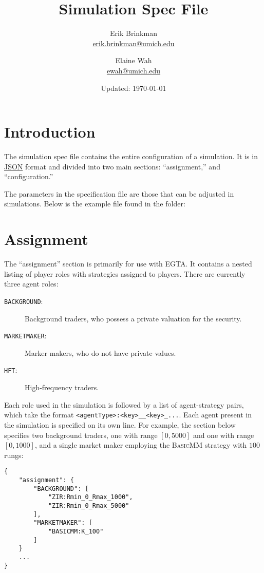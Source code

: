 \documentclass[11pt]{article}
\begin{document}
	
\title{Simulation Spec File}
\author{
  Erik Brinkman \\
  \href{mailto:erik.brinkman@umich.edu}{erik.brinkman@umich.edu}
  \and
  Elaine Wah \\
  \href{mailto:ewah@umich.edu}{ewah@umich.edu}
}
\date{Updated: \today}
\maketitle

\section{Introduction}

The simulation spec file contains the entire configuration of a simulation. It
is in \href{https://en.wikipedia.org/wiki/Json}{JSON} format and divided into
two main sections: ``assignment,'' and ``configuration.''

The parameters in the specification file are those that can be adjusted in
simulations. Below is the example  file found in
the  folder:



\section{Assignment}

The ``assignment'' section is primarily for use with EGTA. It contains a
nested listing of player roles with strategies assigned to players. 
%
There are currently three agent roles:
 \begin{description}
  \item[\texttt{BACKGROUND}:] Background traders, who possess a private valuation for the security.
  \item[\texttt{MARKETMAKER}:] Marker makers, who do not have private values.
  \item[\texttt{HFT}:] High-frequency traders.
  \end{description}

Each role used in the simulation is followed by a list of agent-strategy pairs, which take the format \texttt{<agentType>:<key>\_<value1>\_<key>\_<value2>...}. Each agent present in the simulation is specified on its own line.
%
For example, the section below specifies two background traders, one with range $[0, 5000]$ and one with range $[0, 1000]$, and a single market maker employing the \textsc{BasicMM} strategy with $100$ rungs:
%
\begin{verbatim}
{
    "assignment": {
        "BACKGROUND": [
            "ZIR:Rmin_0_Rmax_1000",
            "ZIR:Rmin_0_Rmax_5000"
        ],
        "MARKETMAKER": [
            "BASICMM:K_100"
        ]
    }
    ...
}
\end{verbatim}
\end{document}
